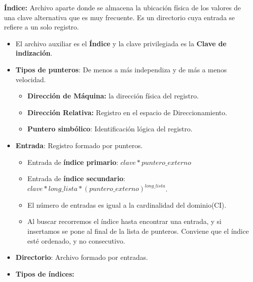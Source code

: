 \documentclass[12pt, twoside, openright]{report} %
\begin{document}
  
  \textbf{Índice:} Archivo aparte donde se almacena la ubicación física
  de los valores de una clave alternativa que es muy frecuente. Es un
  directorio cuya entrada se refiere a un solo registro.
  

  \begin{itemize}
  \item El archivo auxiliar es el \textbf{Índice} y la clave privilegiada es
    la \textbf{Clave de indización}.
    
  \item \textbf{Tipos de punteros}: De menos a más independiza y de más a
    menos velocidad.
    

    \begin{itemize}
    \item \textbf{Dirección de Máquina:} la dirección física del registro.
      
    \item \textbf{Dirección Relativa:} Registro en el espacio de
      Direccionamiento.
      
    \item \textbf{Puntero simbólico}: Identificación lógica del registro.
      
    \end{itemize}
  \item \textbf{Entrada}: Registro formado por punteros.
    

    \begin{itemize}
    \item Entrada de \textbf{índice primario}: $clave * puntero\_externo$
      
    \item Entrada de \textbf{índice secundario}: $clave * long\_lista * (puntero\_externo)^{long\_lista}$.
      
    \item El número de entradas es igual a la cardinalidad del dominio(CI).
      
    \item Al buscar recorremos el índice hasta encontrar una entrada, y si
      insertamos se pone al final de la lista de punteros. Conviene que
      el índice esté ordenado, y no consecutivo.
      
    \end{itemize}
  \item \textbf{Directorio}: Archivo formado por entradas.
    
  \item \textbf{Tipos de índices:}
    


\end{itemize}
\end{document}
